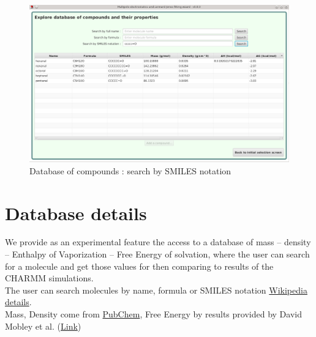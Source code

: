 \documentclass[12pt,a4paper]{article}
\begin{document}
\begin{figure}[h!]
\centering
\includegraphics[width=0.9\linewidth]{pics/scr14}
\caption{Database of compounds : search by SMILES notation}
\label{fig14}
\end{figure}

\clearpage


%


\section{Database details}

We provide as an experimental feature the access to a database of 
mass -- density -- Enthalpy of Vaporization -- Free Energy of solvation, where the user can search 
for a molecule and get those values for then comparing to results of the CHARMM simulations.\\

The user can search molecules by name, formula or SMILES notation 
\href{http://en.wikipedia.org/wiki/Simplified_molecular-input_line-entry_system}{Wikipedia 
details}.\\

Mass, Density come from \href{https://pubchem.ncbi.nlm.nih.gov/search/}{PubChem}, Free Energy by 
results provided by David Mobley et al. (\href{http://escholarship.org/uc/item/6sd403pz}{Link})\\
\end{document}

